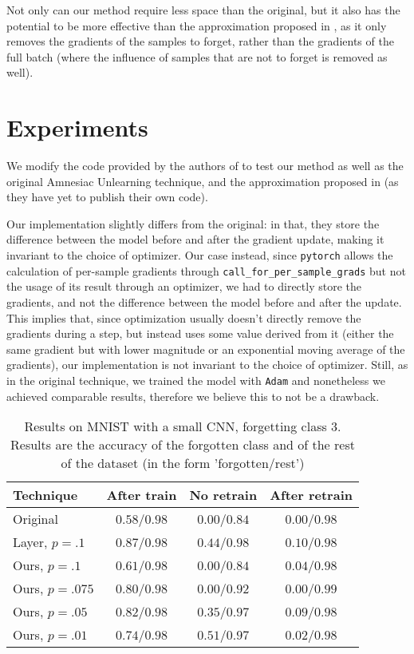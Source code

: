 \documentclass{article}
\begin{document}
Not only can our method require less space than the original, but it also has the potential to be more effective than the approximation proposed in \cite{gogineni2024efficient}, as it only removes the gradients of the samples to forget, rather than the gradients of the full batch (where the influence of samples that are not to forget is removed as well).

\section{Experiments} We modify the code provided by the authors of \cite{graves2021amnesiac} to test our method as well as the original Amnesiac Unlearning technique, and the approximation proposed in \cite{gogineni2024efficient} (as they have yet to publish their own code).

Our implementation slightly differs from the original: in that, they store the difference between the model before and after the gradient update, making it invariant to the choice of optimizer. Our case instead, since \texttt{pytorch} allows the calculation of per-sample gradients through \texttt{call\_for\_per\_sample\_grads} but not the usage of its result through an optimizer, we had to directly store the gradients, and not the difference between the model before and after the update. This implies that, since optimization usually doesn't directly remove the gradients during a step, but instead uses some value derived from it (either the same gradient but with lower magnitude or an exponential moving average of the gradients), our implementation is not invariant to the choice of optimizer. Still, as in the original technique, we trained the model with \texttt{Adam} and nonetheless we achieved comparable results, therefore we believe this to not be a drawback.

\begin{table}
\centering
\caption{Results on MNIST with a small CNN, forgetting class $3$. Results are the accuracy of the forgotten class and of the rest of the dataset (in the form 'forgotten/rest')}
\label{tab:mnist_small_cnn}
\begin{tabular}{l | c | c c}
    Technique&After train&No retrain&After retrain\\
    \hline
    Original&$0.58$/$0.98$& $0.00$/$0.84$& $0.00$/$0.98$\\
    Layer, $p=.1$&$0.87$/$0.98$& $0.44$/$0.98$& $0.10$/$0.98$\\
    \hline
    Ours, $p=.1$&$0.61$/$0.98$& $0.00$/$0.84$& $0.04$/$0.98$\\
    Ours, $p=.075$&$0.80$/$0.98$& $0.00$/$0.92$& $0.00$/$0.99$\\
    Ours, $p=.05$&$0.82$/$0.98$& $0.35$/$0.97$& $0.09$/$0.98$\\
    Ours, $p=.01$&$0.74$/$0.98$&$0.51$/$0.97$& $0.02$/$0.98$\\
\end{tabular}
\end{table}
\end{document}
